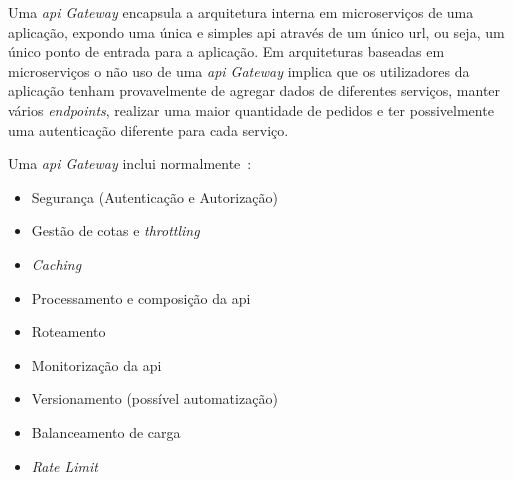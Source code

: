 Uma \textit{\acrshort{api} Gateway} encapsula a arquitetura interna em microserviços de uma aplicação, expondo uma única e simples \acrshort{api} através de um único \acrshort{url}, ou seja, um único ponto de entrada para a aplicação. Em arquiteturas baseadas em microserviços o não uso de uma \textit{\acrshort{api} Gateway} implica que os utilizadores da aplicação tenham provavelmente de agregar dados de diferentes serviços, manter vários \textit{endpoints}, realizar uma maior quantidade de pedidos e ter possivelmente uma autenticação diferente para cada serviço.

Uma \textit{\acrshort{api} Gateway} inclui normalmente~\cite{apiGatInfo,apiGatInfo2}:
\begin{itemize}
    \item Segurança (Autenticação e Autorização)
    \item Gestão de cotas e \textit{throttling}
    \item \textit{Caching}
    \item Processamento e composição da \acrshort{api}
    \item Roteamento
    \item Monitorização da \acrshort{api}
    \item Versionamento (possível automatização)
    \item Balanceamento de carga
    \item \textit{Rate Limit}
\end{itemize}

